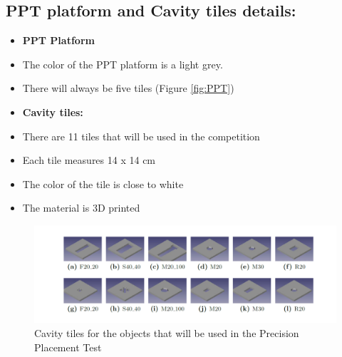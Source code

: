 \documentclass{article}
\begin{document}
\subsection{PPT platform and Cavity tiles details: }

\begin{itemize}
\item \textbf{PPT Platform}
\item The color of the PPT platform is a light grey.
\item There will always be five tiles (Figure \ref{fig:PPT}) 

\item \textbf{Cavity tiles:}
\item There are 11 tiles that will be used in the competition
\item Each tile measures 14 x 14 cm 
\item The color of the tile is close to white
\item The material is 3D printed
\end{itemize}
\begin{figure}[h!]
\centering
\includegraphics[scale=1.0]{images/AllTiles.png}
\caption{Cavity tiles for the objects that will be used in the Precision Placement Test \cite{first}}
\label{fig:tiles}
\end{figure}
\end{document}
